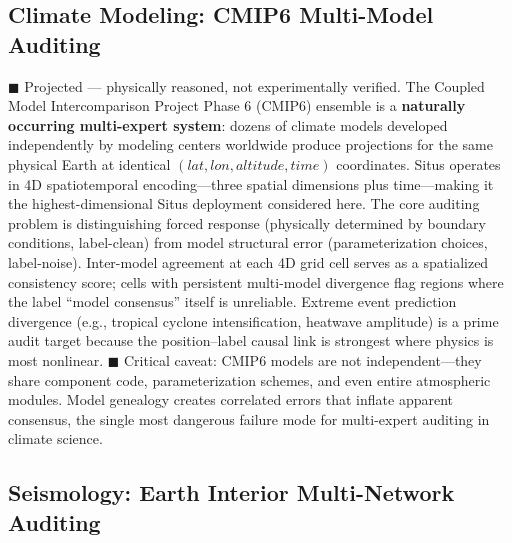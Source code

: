 \documentclass[12pt,a4paper]{article}
\begin{document}
\subsection{Climate Modeling: CMIP6 Multi-Model Auditing}

\textcolor{projected}{$\blacksquare$ Projected — physically reasoned, not experimentally verified.}
The Coupled Model Intercomparison Project Phase 6 (CMIP6\cite{eyring2016}) ensemble is a \textbf{naturally occurring multi-expert system}: dozens of climate models developed independently by modeling centers worldwide produce projections for the same physical Earth at identical $(lat,lon,altitude,time)$ coordinates. Situs operates in 4D spatiotemporal encoding—three spatial dimensions plus time—making it the highest-dimensional Situs deployment considered here. The core auditing problem is distinguishing forced response (physically determined by boundary conditions, label-clean) from model structural error (parameterization choices, label-noise). Inter-model agreement at each 4D grid cell serves as a spatialized consistency score; cells with persistent multi-model divergence flag regions where the label ``model consensus'' itself is unreliable. Extreme event prediction divergence (e.g., tropical cyclone intensification, heatwave amplitude) is a prime audit target because the position--label causal link is strongest where physics is most nonlinear. \textcolor{warning}{$\blacksquare$ Critical caveat}: CMIP6 models are not independent—they share component code, parameterization schemes, and even entire atmospheric modules. Model genealogy\cite{knutti2013} creates correlated errors that inflate apparent consensus, the single most dangerous failure mode for multi-expert auditing in climate science.

\subsection{Seismology: Earth Interior Multi-Network Auditing}
\end{document}
